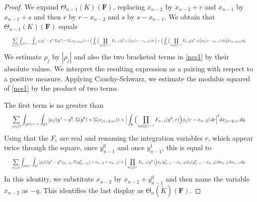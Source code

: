 \documentclass[12pt,reqno]{amsart}
\theoremstyle{plain}
\numberwithin{equation}{section}
\theoremstyle{remark}
\newcommand{\R}{{\mathbb R}}
\newcommand{\F}{\mathbf{F}}
\begin{document}
\begin{proof}
We expand $\Theta_{n-1}(K)(\F)$, replacing $x_{n-2}$ by $x_{n-2}+r$ and $x_{n-1}$ by $x_{n-1}+s$
and then $r$ by $r-x_{n-2}$ and $s$ by $s-x_{n-1}$. We obtain that $\Theta_{n-1}(K)(\F)$ equals
\begin{equation}\label{ncs1}
\resizebox{0.98\textwidth}{!}{$\displaystyle \sum_{j\in[J)} \int_{(\R^2)^{n-1}} \int_{\R^2} \rho_j(y^1-y^0, \Sigma(y^0)+\Sigma(x_{[n-2,n)})) \times \Big( \int_{\R} \Big(\prod_{h\in [2)^{n-1}} F_{n-1}(y^h,r)\Big) \phi_j(r-x_{n-2})\,dr\Big) \times \Big( \int_{\R} \Big(\prod_{h\in [2)^{n-1}} F_{n-2}(y^h,s)\Big) \phi_j(s-x_{n-1})\,ds\Big) dx_{[n-2,n)}\,dy .$}
\end{equation}
We estimate $\rho_j$ by $|\rho_j|$ and also the two bracketed terms in \eqref{ncs1} by their absolute values.
We interpret the resulting expression as a pairing with respect to a positive measure.
Applying Cauchy-Schwarz, we estimate the modulus squared of \eqref{ncs1} by the product of two terms.

The first term is no greater than
\begin{equation}
\resizebox{0.98\textwidth}{!}{$\displaystyle \sum_{j\in[J)} \int_{(\R^2)^{n-1}} \int_{\R^2} |\rho_j|(y^1-y^0, \Sigma(y^0)+\Sigma(x_{[n-2,n)})) \times \Big| \int_{\R} \Big(\prod_{h\in [2)^{n-1}} F_{n-1}(y^h,r)\Big) \phi_j(r-x_{n-2})\,dr \Big|^2 dx_{[n-2,n)}\,dy .$}
\end{equation}
Using that the $F_i$ are real and renaming the integration variables $r$, which appear twice
through the square, once $y_{n-1}^0$ and once $y_{n-1}^1$, this is equal to
\begin{equation}
\resizebox{0.98\textwidth}{!}{$\displaystyle \sum_{j\in[J)} \int_{(\R^2)^n}\int_{\R^2} |\rho_j|((y^1-y^0)_{[n-1)},\Sigma(y^0_{[n-1)})+x_{n-2}+x_{n-1}) \times \Big(\prod_{h\in[2)^n}F_{n-1}(y^h)\Big) \phi_j(y_{n-1}^1-x_{n-2})\phi_j(y_{n-1}^0-x_{n-2}) \,dx_{n-2}\,dx_{n-1}\,dy .$}
\end{equation}
In this identity, we substitute $x_{n-2}$ by $x_{n-2}+y_{n-1}^0$ and then name the variable $x_{n-2}$ as $-q$.
This identifies the last display as $\Theta_n(\tilde K)(\F)$.


\end{proof}
\end{document}
